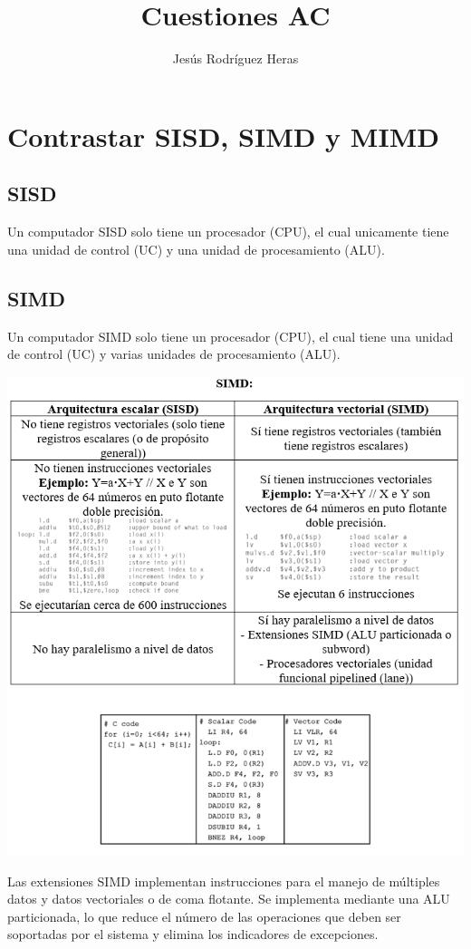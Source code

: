 \documentclass[11pt,letterpaper]{article}
\title{Cuestiones AC}
\author{Jesús Rodríguez Heras}
\begin{document}
\maketitle
\thispagestyle{empty}
\newpage

\tableofcontents
\newpage

\section{Contrastar SISD, SIMD y MIMD}
\subsection{SISD}
\noindent
Un computador SISD solo tiene un procesador (CPU), el cual unicamente tiene una unidad de control (UC) y una unidad de procesamiento (ALU).
\subsection{SIMD}
\noindent
Un computador SIMD solo tiene un procesador (CPU), el cual tiene una unidad de control (UC) y varias unidades de procesamiento (ALU).
\begin{center}
	\includegraphics[scale=0.9]{SIMD.png}
\end{center}
\newpage
\noindent
Las extensiones SIMD implementan instrucciones para el manejo de múltiples datos y datos vectoriales o de coma flotante. Se implementa mediante una ALU particionada, lo que reduce el número de las operaciones que deben ser soportadas por el sistema y elimina los indicadores de excepciones.\\
\end{document}
